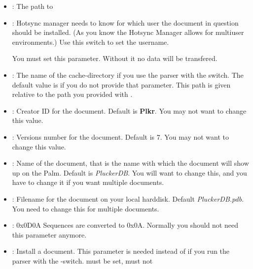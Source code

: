 \begin{itemize}
  \item {}: The path to 
  \item {}: Hotsync manager needs to know for which user the
document in question should be installed. (As you know the Hotsync
Manager allows for multiuser environments.) Use this switch to set
the username.

\note You must set this parameter. Without it no data will be
transfered.

  \item {}: The name of the cache-directory if you use the
parser with the  switch. The default value is 
if you do not provide that parameter. This path is given relative to
the path you provided with .

  \item {}: Creator ID for the document. Default is \textbf{Plkr}. You
may not want to change this value.

  \item {}: Versions number for the document.
  Default is 7. You may not want to change this value.
  \item {}: Name of the document, that is the name with
which the document will show up on the Palm. Default is \emph{PluckerDB}.
You will want to change this, and you have to change it if you want
multiple documents.
   \item {}: Filename for the document on your local
harddisk. Default \emph{PluckerDB.pdb}. You need to change this for
multiple documents.
  \item {}: 0x0D0A Sequences are converted to 0x0A. Normally
you should not need this parameter anymore.
  \item {}: Install a document. This parameter is needed
instead of  if you run the parser with the
-switch.  must be set,  must not


\end{itemize}
